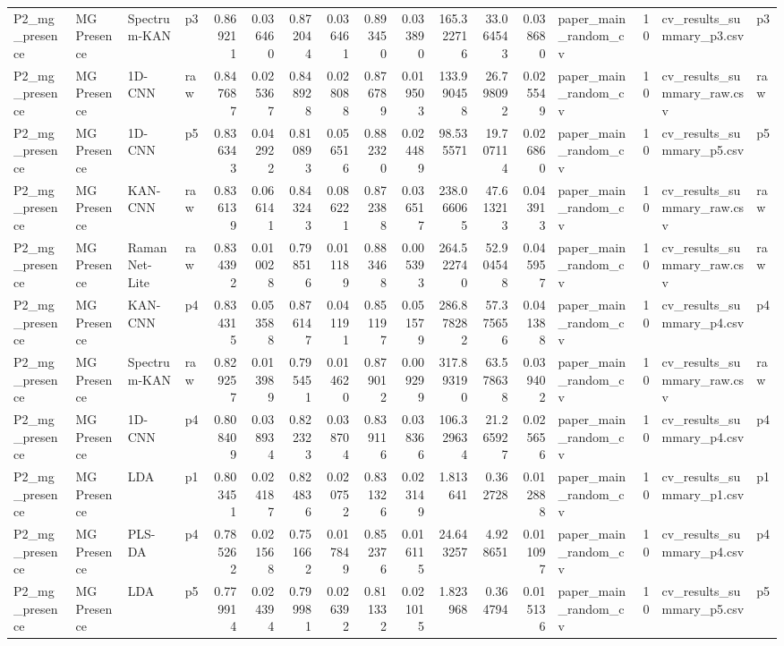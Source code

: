 \begin{tabular}{llllrrrrrrrrrlrll}
P2_mg_presence & MG Presence & Spectrum-KAN & p3 & 0.869211 & 0.036460 & 0.872044 & 0.036461 & 0.893450 & 0.033890 & 165.322716 & 33.064543 & 0.038680 & paper_main_random_cv & 10 & cv_results_summary_p3.csv & p3 \\
P2_mg_presence & MG Presence & 1D-CNN & raw & 0.847687 & 0.025367 & 0.848928 & 0.028088 & 0.876789 & 0.019503 & 133.990458 & 26.798092 & 0.025549 & paper_main_random_cv & 10 & cv_results_summary_raw.csv & raw \\
P2_mg_presence & MG Presence & 1D-CNN & p5 & 0.836343 & 0.042922 & 0.810893 & 0.056516 & 0.882320 & 0.024489 & 98.535571 & 19.707114 & 0.026860 & paper_main_random_cv & 10 & cv_results_summary_p5.csv & p5 \\
P2_mg_presence & MG Presence & KAN-CNN & raw & 0.836139 & 0.066141 & 0.843243 & 0.086221 & 0.872388 & 0.036517 & 238.066065 & 47.613213 & 0.043913 & paper_main_random_cv & 10 & cv_results_summary_raw.csv & raw \\
P2_mg_presence & MG Presence & RamanNet-Lite & raw & 0.834392 & 0.010028 & 0.798516 & 0.011189 & 0.883468 & 0.005393 & 264.522740 & 52.904548 & 0.045957 & paper_main_random_cv & 10 & cv_results_summary_raw.csv & raw \\
P2_mg_presence & MG Presence & KAN-CNN & p4 & 0.834315 & 0.053588 & 0.876147 & 0.041191 & 0.851197 & 0.051579 & 286.878282 & 57.375656 & 0.041388 & paper_main_random_cv & 10 & cv_results_summary_p4.csv & p4 \\
P2_mg_presence & MG Presence & Spectrum-KAN & raw & 0.829257 & 0.013989 & 0.795451 & 0.014620 & 0.879012 & 0.009299 & 317.893190 & 63.578638 & 0.039402 & paper_main_random_cv & 10 & cv_results_summary_raw.csv & raw \\
P2_mg_presence & MG Presence & 1D-CNN & p4 & 0.808409 & 0.038934 & 0.822323 & 0.038704 & 0.839116 & 0.038366 & 106.329634 & 21.265927 & 0.025656 & paper_main_random_cv & 10 & cv_results_summary_p4.csv & p4 \\
P2_mg_presence & MG Presence & LDA & p1 & 0.803451 & 0.024187 & 0.824836 & 0.020752 & 0.831326 & 0.023149 & 1.813641 & 0.362728 & 0.012888 & paper_main_random_cv & 10 & cv_results_summary_p1.csv & p1 \\
P2_mg_presence & MG Presence & PLS-DA & p4 & 0.785262 & 0.021568 & 0.751662 & 0.017849 & 0.852376 & 0.016115 & 24.643257 & 4.928651 & 0.011097 & paper_main_random_cv & 10 & cv_results_summary_p4.csv & p4 \\
P2_mg_presence & MG Presence & LDA & p5 & 0.779914 & 0.024394 & 0.799981 & 0.026392 & 0.811332 & 0.021015 & 1.823968 & 0.364794 & 0.015136 & paper_main_random_cv & 10 & cv_results_summary_p5.csv & p5 \\

\end{tabular}
